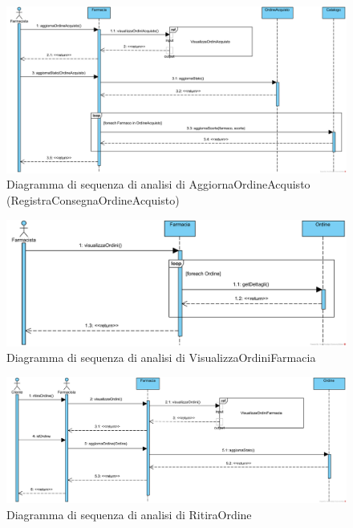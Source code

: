 \begin{figure}[h]
    \centering
	\includegraphics[width=\linewidth]{assets/sequence_analisi/SequenceAnalisiAggiornaOrdineAcquisto.png}
    \caption{Diagramma di sequenza di analisi di AggiornaOrdineAcquisto (RegistraConsegnaOrdineAcquisto)}
\end{figure}

\begin{figure}[h]
    \centering
	\includegraphics[width=\linewidth]{assets/sequence_analisi/SequenceAnalisiVisualizzaOrdiniFarmacia.png}
    \caption{Diagramma di sequenza di analisi di VisualizzaOrdiniFarmacia}
\end{figure}

\begin{figure}[h]
    \centering
	\includegraphics[width=\linewidth]{assets/sequence_analisi/SequenceAnalisiRitiraOrdine.png}
    \caption{Diagramma di sequenza di analisi di RitiraOrdine}
\end{figure}

